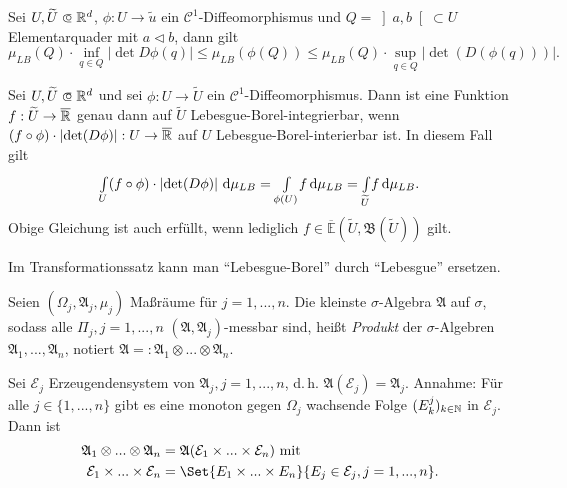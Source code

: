\documentclass{cheat-sheet}
\newcommand{\Alg}{\mathfrak{A}} %
\newcommand{\Bor}{\mathfrak{B}} %
\newcommand{\E}{\mathbb{E}} %
\theoremstyle{definition}
\begin{document}
\begin{satz}
  Sei $U, \widetilde{U} \opn \R^d$, $\phi : U \to \widetilde{u}$ ein $\mathcal{C}^1$-Diffeomorphismus und $Q = \left]a, b\right[ \subset U$ Elementarquader mit $a \lhd b$, dann gilt
  \[ \mu_{LB}(Q) \cdot \inf_{q \in Q} \left|\det D \phi(q)\right| \leq \mu_{LB}(\phi(Q)) \leq \mu_{LB}(Q) \cdot \sup_{q \in Q} \left|\det(D(\phi(q)))\right|. \]
\end{satz}

\begin{satz}[Transformationssatz]
  Sei $U, \widetilde{U} \opn \R^d$ und sei $\phi : U \to \widetilde{U}$ ein $\mathcal{C}^1$-Diffeomorphismus. Dann ist eine Funktion $f : \widetilde{U} \to \overline{\mathbb{R}}$ genau dann auf $\widetilde{U}$ Lebesgue-Borel-integrierbar, wenn $(f \circ \phi) \cdot \left|\det(D\phi)\right| : U \to \overline{\mathbb{R}}$ auf $U$ Lebesgue-Borel-interierbar ist. In diesem Fall gilt
  \[ {\textstyle \int\limits_{U}^{}} (f \circ \phi) \cdot \left|\det(D\phi)\right| \,\mathrm{d} \mu_{LB} = {\textstyle \int\limits_{\phi(U)}^{}} f \,\mathrm{d} \mu_{LB} = {\textstyle \int\limits_{\widetilde{U}}^{}} f \,\mathrm{d} \mu_{LB}. \]
  Obige Gleichung ist auch erfüllt, wenn lediglich $f \in \overline{\E}(\widetilde{U}, \Bor(\widetilde{U}))$ gilt.
\end{satz}

\begin{bem}
  Im Transformationssatz kann man "`Lebesgue-Borel"' durch "`Lebesgue"' ersetzen.
\end{bem}



% 

\begin{defn}
  Seien $(\Omega_j, \Alg_j, \mu_j)$ Maßräume für $j = 1, ..., n$. Die kleinste $\sigma$-Algebra $\Alg$ auf $\sigma$, sodass alle $\Pi_j, j = 1, ..., n$ $(\Alg, \Alg_j)$-messbar sind, heißt \emph{Produkt} der $\sigma$-Algebren $\Alg_1, ..., \Alg_n$, notiert $\Alg =: \Alg_1 \otimes ... \otimes \Alg_n$.
\end{defn}

\begin{satz}
  Sei $\mathcal{E}_j$ Erzeugendensystem von $\Alg_j, j = 1, ..., n$, d.\,h. $\Alg(\mathcal{E}_j) = \Alg_j$. Annahme: Für alle $j \in \{ 1, ..., n \}$ gibt es eine monoton gegen $\Omega_j$ wachsende Folge $(E^j_k)_{k \in \mathbb{N}}$ in $\mathcal{E}_j$. Dann ist
  \begin{align*}
    \Alg_1 \otimes ... \otimes \Alg_n &= \Alg(\mathcal{E}_1 \times ... \times \mathcal{E}_n) \text{ mit }\\
    \mathcal{E}_1 \times ... \times \mathcal{E}_n &= \Set{ E_1 \times ... \times E_n }{ E_j \in \mathcal{E}_j, j = 1, ..., n }.
  \end{align*}
\end{satz}
\end{document}
